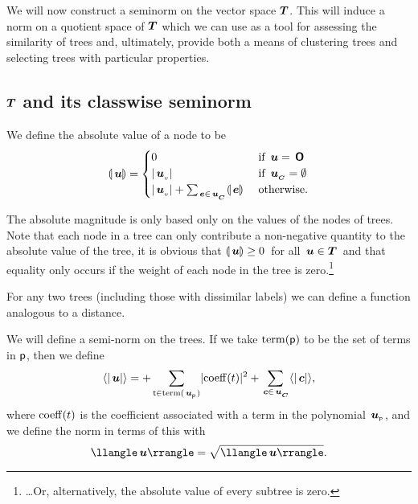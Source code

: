 We will now construct a seminorm on the vector space
$\boldsymbol{T}$. This will induce a norm on a quotient space of $\boldsymbol{T}$ which we
can use as a tool for assessing the similarity of trees and,
ultimately, provide both a means of clustering trees and selecting
trees with particular properties.

\subsection{$\boldsymbol{T}$ and its classwise seminorm}
\begin{definition}\label{absolute-mag}
 We define the absolute value of a node to be
\begin{align*}
\llparenthesis{\,\boldsymbol{u}}\rrparenthesis = \begin{cases}
  0 & \text{ if } \,\boldsymbol{u} = \,\boldsymbol{\mathsf{O}} \\
  \lvert{{\,\boldsymbol{u}}_{{}_{v}}}\rvert & \text{ if }{\,\boldsymbol{u}}_{{}_{\boldsymbol{C}}} = \emptyset \\
  \lvert{{\,\boldsymbol{u}}_{{}_{v}}}\rvert + \sum_{\,\boldsymbol{e}\in{\,\boldsymbol{u}}_{{}_{\boldsymbol{C}}}}\llparenthesis{\,\boldsymbol{e}}\rrparenthesis & \text{ otherwise.}
\end{cases}
\end{align*}
\end{definition}
The absolute magnitude is only based only on the values of the
nodes of trees. %
Note that each node in a tree can only contribute a non-negative
quantity to the absolute value of the tree, it is obvious that
\(\llparenthesis{\,\boldsymbol{u}}\rrparenthesis \geq 0\)\ for all \(\,\boldsymbol{u} \in \boldsymbol{T}\)\ and that
equality only occurs if the weight of each node in the tree 
is zero.\footnote{\ldots Or, alternatively, the absolute value of every subtree is zero.}

For any two trees (including those with dissimilar labels) we can
define a function analogous to a distance.

\begin{definition}\label{treenorm}
  We will define a semi-norm on the trees. 
  If we take $\operatorname{term}(\mathsf{p})$ to be the set of terms in $\mathsf{p}$,
  then we define
  \begin{equation}
    \langle\rvert{\,\boldsymbol{u}}\lvert\rangle={\label{u} + \sum_{\substack{\mathsf{t}\in\operatorname{term}({\,\boldsymbol{u}}_{{}_{\mathsf{P}}})}}\lvert{\operatorname{coeff}({t})}\rvert^2+\sum_{\substack{\,\boldsymbol{c}\in{\,\boldsymbol{u}}_{{}_{\boldsymbol{C}}}}}\langle\rvert{\,\boldsymbol{c}}\lvert\rangle},
  \end{equation}
  where $\operatorname{coeff}(t)$ is the coefficient associated with a term in the polynomial ${\,\boldsymbol{u}}_{{}_{\mathsf{P}}}$,
  and we define the norm in terms of this with
  \begin{equation}
    \nnorm{\node{u}}=\sqrt{\nnorm{\node{u}}}.
  \end{equation}
\end{definition}

